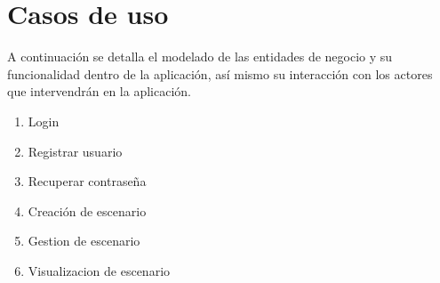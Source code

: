 \section{Casos de uso}
A continuación se detalla el modelado de las entidades de negocio y su funcionalidad dentro de la aplicación, así mismo su interacción con los actores que intervendrán en la aplicación.\par
\vspace{5mm}
\begin{enumerate}[1.]
\item Login
\item Registrar usuario
\item Recuperar contraseña
\item Creación de escenario
\item Gestion de escenario
\item Visualizacion de escenario
\end{enumerate}
